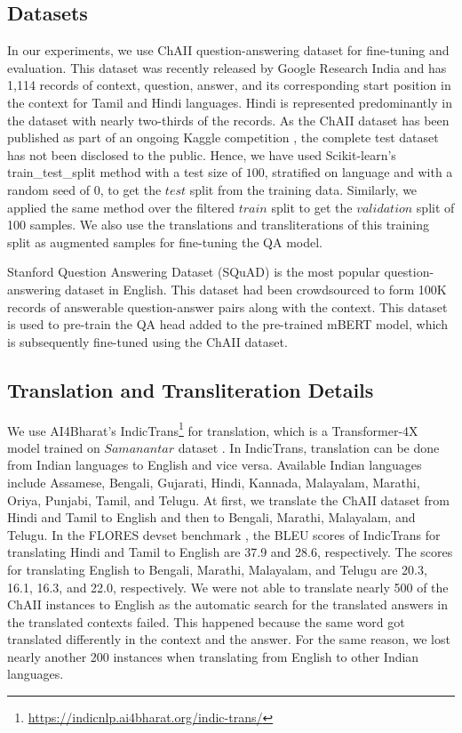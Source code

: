 \documentclass[11pt]{article}
\begin{document}
\subsection{Datasets}
In our experiments, we use ChAII \cite{ChAII} question-answering dataset for fine-tuning and evaluation. This dataset was recently released by Google Research India and has 1,114 records of context, question, answer, and its corresponding start position in the context for Tamil and Hindi languages. Hindi is represented predominantly in the dataset with nearly two-thirds of the records. As the ChAII dataset has been published as part of an ongoing Kaggle competition \cite{ChAII}, the complete test dataset has not been disclosed to the public. Hence, we have used Scikit-learn's train\_test\_split method with a test size of $100$, stratified on language and with a random seed of $0$, to get the $test$ split from the training data. Similarly, we applied the same method over the filtered $train$ split to get the $validation$ split of 100 samples. We also use the translations and transliterations of this training split as augmented samples for fine-tuning the QA model.

Stanford Question Answering Dataset (SQuAD) \cite{rajpurkar2016SQuAD} is the most popular question-answering dataset in English. This dataset had been crowdsourced to form 100K records of answerable question-answer pairs along with the context. This dataset is used to pre-train the QA head added to the pre-trained mBERT model, which is subsequently fine-tuned using the ChAII dataset.

\subsection{Translation and Transliteration Details}
We use AI4Bharat's IndicTrans\footnote{\url{https://indicnlp.ai4bharat.org/indic-trans/}} \cite{ramesh2021samanantar} for translation, which is a Transformer-4X model trained on $Samanantar$ dataset \cite{ramesh2021samanantar}. In IndicTrans, translation can be done from Indian languages to English and vice versa. Available Indian languages include Assamese, Bengali, Gujarati, Hindi, Kannada, Malayalam, Marathi, Oriya, Punjabi, Tamil, and Telugu. At first, we translate the ChAII dataset from Hindi and Tamil to English and then to Bengali, Marathi, Malayalam, and Telugu. In the FLORES devset benchmark \cite{goyal2021flores}, the BLEU scores of IndicTrans for translating Hindi and Tamil to English are 37.9 and 28.6, respectively. The scores for translating English to Bengali, Marathi, Malayalam, and Telugu are 20.3, 16.1, 16.3, and 22.0, respectively. We were not able to translate nearly 500 of the ChAII instances to English as the automatic search for the translated answers in the translated contexts failed. This happened because the same word got translated differently in the context and the answer. For the same reason, we lost nearly another 200 instances when translating from English to other Indian languages.
\end{document}
